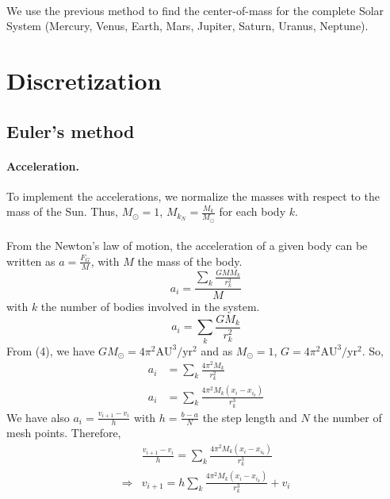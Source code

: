 \documentclass[a4paper, twoside, 11pt]{report}
\theoremstyle{theorem}
\theoremstyle{remark}
\theoremstyle{exemple}
\begin{document}
        \paragraph{}We use the previous method to find the center-of-mass for the complete Solar System (Mercury, Venus, Earth, Mars, Jupiter, Saturn, Uranus, Neptune).
        

    \section{Discretization}
        \subsection{Euler's method}
            \paragraph{Acceleration.}To implement the accelerations, we normalize the masses with respect to the mass of the Sun. Thus, $M_{\odot}=1$, $M_{k_N}=\frac{M_k}{M_{\odot}}$ for each body $k$.
            \paragraph{} From the Newton's law of motion, the acceleration of a given body can be written as $a=\frac{F_G}{M}$, with $M$ the mass of the body. 
                \begin{equation*}
                    a_i = \frac{ \sum\limits_{k} \frac{GMM_k}{r_k^2}}{M}
                \end{equation*}
            with $k$ the number of bodies involved in the system. 
                \begin{equation*}
                    a_i = \sum\limits_{k} \frac{GM_k}{r_k^2}
                \end{equation*}
            From (4), we have $GM_{\odot} = 4\pi^2\mathrm{AU}^3/\mathrm{yr}^2$ and as $M_{\odot}=1$, $G=4\pi^2\mathrm{AU}^3/\mathrm{yr}^2$. So,
                \begin{align*}
                    a_i &= \sum\limits_{k} \frac{4\pi^2M_k}{r_k^2} \\
                    a_i &= \sum\limits_{k} \frac{4\pi^2M_k(x_i-x_{i_k})}{r_k^3} 
                    \tag{7}
                 \end{align*}
             We have also $\displaystyle a_i=\frac{v_{i+1} - v_i}{h}$ with $\displaystyle h = \frac{b-a}{N}$ the step length and $N$ the number of mesh points. Therefore, 
                \begin{align*}
                     &\frac{v_{i+1} - v_i}{h} = \sum\limits_{k}\frac{4\pi^2M_k(x_i-x_{i_k})}{r_k^3} \\
                     \Rightarrow &v_{i+1} = h\sum\limits_{k}\frac{4\pi^2M_k(x_i-x_{i_k})}{r_k^3} + v_i
                    \tag{8}
                \end{align*}
\end{document}
